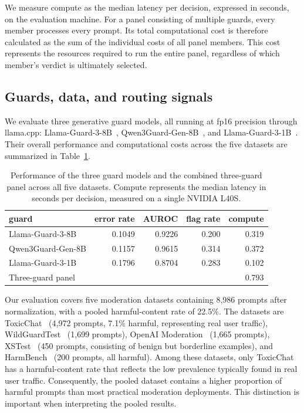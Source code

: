 \documentclass[11pt]{article}
\begin{document}
We measure compute as the median latency per decision, expressed in seconds, on the evaluation machine. For a panel consisting of multiple guards, every member processes every prompt. Its total computational cost is therefore calculated as the sum of the individual costs of all panel members. This cost represents the resources required to run the entire panel, regardless of which member's verdict is ultimately selected.

\subsection{Guards, data, and routing signals}

We evaluate three generative guard models, all running at fp16 precision through llama.cpp: Llama-Guard-3-8B~\cite{inan2023llamaguard}, Qwen3Guard-Gen-8B~\cite{zhao2025qwen3guard}, and Llama-Guard-3-1B~\cite{fedorov2024llamaguard1b}. Their overall performance and computational costs across the five datasets are summarized in Table~\ref{tab:guards}.

\begin{table}[ht]
\centering
\small
\caption{Performance of the three guard models and the combined three-guard panel across all five datasets. Compute represents the median latency in seconds per decision, measured on a single NVIDIA L40S.}
\label{tab:guards}
\begin{tabular}{lrrrr}
\toprule
guard & error rate & AUROC & flag rate & compute \\
\midrule
Llama-Guard-3-8B & 0.1049 & 0.9226 & 0.200 & 0.319 \\
Qwen3Guard-Gen-8B & 0.1157 & 0.9615 & 0.314 & 0.372 \\
Llama-Guard-3-1B & 0.1796 & 0.8704 & 0.283 & 0.102 \\
Three-guard panel & & & & 0.793 \\
\bottomrule
\end{tabular}
\end{table}

Our evaluation covers five moderation datasets containing 8,986 prompts after normalization, with a pooled harmful-content rate of 22.5\%. The datasets are ToxicChat~\cite{lin2023toxicchat} (4,972 prompts, 7.1\% harmful, representing real user traffic), WildGuardTest~\cite{han2024wildguard} (1,699 prompts), OpenAI Moderation~\cite{markov2023holistic} (1,665 prompts), XSTest~\cite{rottger2024xstest} (450 prompts, consisting of benign but borderline examples), and HarmBench~\cite{mazeika2024harmbench} (200 prompts, all harmful). Among these datasets, only ToxicChat has a harmful-content rate that reflects the low prevalence typically found in real user traffic. Consequently, the pooled dataset contains a higher proportion of harmful prompts than most practical moderation deployments. This distinction is important when interpreting the pooled results.
\end{document}
